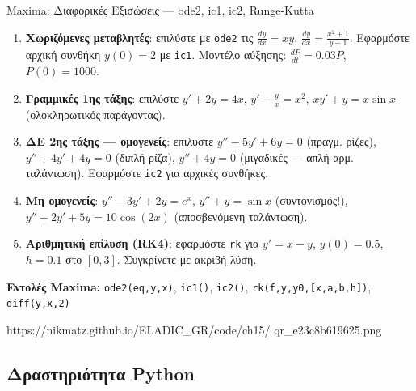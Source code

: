 %

\casactivbox%
  {Maxima: Διαφορικές Εξισώσεις — ode2, ic1, ic2, Runge-Kutta}%
  {%
    \label{cas:ch15_ode}
    \begin{enumerate}[label=(\alph*),itemsep=2pt]
      \item \textbf{Χωριζόμενες μεταβλητές}: επιλύστε με
        \texttt{ode2} τις $\frac{dy}{dx}=xy$,
        $\frac{dy}{dx}=\frac{x^2+1}{y+1}$.
        Εφαρμόστε αρχική συνθήκη $y(0)=2$ με \texttt{ic1}.
        Μοντέλο αύξησης: $\frac{dP}{dt}=0.03P$, $P(0)=1000$.
      \item \textbf{Γραμμικές 1ης τάξης}: επιλύστε
        $y'+2y=4x$, $y'-\frac{y}{x}=x^2$, $xy'+y=x\sin x$
        (ολοκληρωτικός παράγοντας).
      \item \textbf{ΔΕ 2ης τάξης — ομογενείς}: επιλύστε
        $y''-5y'+6y=0$ (πραγμ. ρίζες),
        $y''+4y'+4y=0$ (διπλή ρίζα),
        $y''+4y=0$ (μιγαδικές — απλή αρμ. ταλάντωση).
        Εφαρμόστε \texttt{ic2} για αρχικές συνθήκες.
      \item \textbf{Μη ομογενείς}: $y''-3y'+2y=e^x$,
        $y''+y=\sin x$ (συντονισμός!),
        $y''+2y'+5y=10\cos(2x)$ (αποσβενόμενη ταλάντωση).
      \item \textbf{Αριθμητική επίλυση (RK4)}: εφαρμόστε
        \texttt{rk} για $y'=x-y$, $y(0)=0.5$, $h=0.1$ στο $[0,3]$.
        Συγκρίνετε με ακριβή λύση.
    \end{enumerate}
    \smallskip
    \textbf{Εντολές Maxima:}
    \texttt{ode2(eq,y,x)}, \texttt{ic1()}, \texttt{ic2()},
    \texttt{rk(f,y,y0,[x,a,b,h])}, \texttt{diff(y,x,2)}
  }%
  {https://nikmatz.github.io/ELADIC_GR/code/ch15/}%
  {qr_e23c8b619625.png}

\subsection*{Δραστηριότητα Python}

